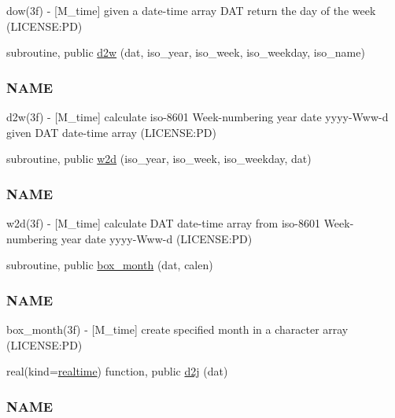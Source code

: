 \begin{DoxyCompactItemize}
\begin{DoxyCompactList}
dow(3f) -\/ \mbox{[}M\+\_\+time\mbox{]} given a date-\/time array D\+AT return the day of the week (L\+I\+C\+E\+N\+SE\+:PD) \end{DoxyCompactList}\item 
subroutine, public \mbox{\hyperlink{namespacem__time_ad4ff99ad6f6d5282c4b65ad636a2a627}{d2w}} (dat, iso\+\_\+year, iso\+\_\+week, iso\+\_\+weekday, iso\+\_\+name)
\begin{DoxyCompactList}\small\item\em \subsubsection*{N\+A\+ME}

d2w(3f) -\/ \mbox{[}M\+\_\+time\mbox{]} calculate iso-\/8601 Week-\/numbering year date yyyy-\/\+Www-\/d given D\+AT date-\/time array (L\+I\+C\+E\+N\+SE\+:PD) \end{DoxyCompactList}\item 
subroutine, public \mbox{\hyperlink{namespacem__time_ac0ec48db8d508bfa23fe4b20c9d1c5a3}{w2d}} (iso\+\_\+year, iso\+\_\+week, iso\+\_\+weekday, dat)
\begin{DoxyCompactList}\small\item\em \subsubsection*{N\+A\+ME}

w2d(3f) -\/ \mbox{[}M\+\_\+time\mbox{]} calculate D\+AT date-\/time array from iso-\/8601 Week-\/numbering year date yyyy-\/\+Www-\/d (L\+I\+C\+E\+N\+SE\+:PD) \end{DoxyCompactList}\item 
subroutine, public \mbox{\hyperlink{namespacem__time_a0fe7540912df30d3578f3c469413aea8}{box\+\_\+month}} (dat, calen)
\begin{DoxyCompactList}\small\item\em \subsubsection*{N\+A\+ME}

box\+\_\+month(3f) -\/ \mbox{[}M\+\_\+time\mbox{]} create specified month in a character array (L\+I\+C\+E\+N\+SE\+:PD) \end{DoxyCompactList}\item 
real(kind=\mbox{\hyperlink{namespacem__time_ac10ea9e8d59ec74eaa7d89f2517d7422}{realtime}}) function, public \mbox{\hyperlink{namespacem__time_a3fccc53c2650104eff084c7998d18f54}{d2j}} (dat)
\begin{DoxyCompactList}\small\item\em \subsubsection*{N\+A\+ME}


\end{DoxyCompactList}
\end{DoxyCompactItemize}
